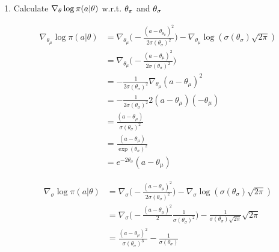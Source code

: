 \documentclass{exam}
\begin{document}
\begin{enumerate}
    \item Calculate $\nabla_{\theta} \log \pi(a | \theta)$ w.r.t. $\theta_{\pi}$ and $\theta_{\sigma}$
        \begin{solutionorlines}[2in]
            \begin{align*}
                \nabla_{\theta_{\mu}} \log \pi(a | \theta) &= \nabla_{\theta_{\mu}} \bigg( - \frac{(a - \theta_{\theta_{\mu}})^2}{2\sigma(\theta_{\sigma})^2} \bigg) - \nabla_{\theta_{\mu}}  \log ( \sigma(\theta_{\sigma}) \sqrt{2\pi} )\\
                &= \nabla_{\theta_{\mu}} \bigg( - \frac{(a - \theta_{\mu})^2}{2\sigma(\theta_{\sigma})^2} \bigg) \\
                &= - \frac{1}{2\sigma(\theta_{\sigma})^2}\nabla_{\theta_{\mu}}(a - \theta_{\mu})^2 \\
                &= - \frac{1}{2\sigma(\theta_{\sigma})^2} 2(a - \theta_{\mu}) (-\theta_{\mu}) \\
                &= \frac{(a - \theta_{\mu})}{\sigma(\theta_{\sigma})^2} \\
                &= \frac{(a - \theta_{\mu})}{\exp(\theta_{\sigma})^2} \\
                &= e^{-2\theta_\sigma}(a - \theta_{\mu})
            \end{align*}
            
            \begin{align*}
                \nabla_{\sigma} \log \pi(a | \theta) &= \nabla_{\sigma} \bigg( - \frac{(a - \theta_{\mu})^2}{2\sigma(\theta_{\sigma})^2} \bigg) - \nabla_{\sigma} \log ( \sigma(\theta_{\sigma}) \sqrt{2\pi} )\\
                &=\nabla_{\sigma} \bigg( - \frac{(a - \theta_{\mu})^2}{2} \frac{1}{\sigma(\theta_{\sigma})^2} \bigg) -  \frac{1}{\sigma(\theta_{\sigma}) \sqrt{2\pi}}  \sqrt{2\pi} \\
                &= \frac{(a - \theta_{\mu})^2}{\sigma(\theta_{\sigma})^3} - \frac{1}{\sigma(\theta_{\sigma}) } \\
            \end{align*}
            

\end{solutionorlines}
\end{enumerate}
\end{document}

